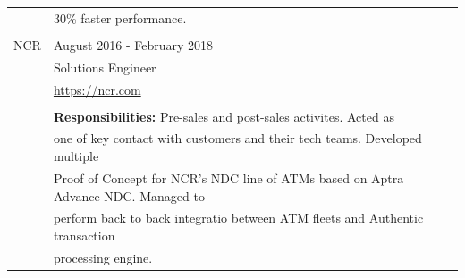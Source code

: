 \documentclass[a4paper]{article}
\begin{document}
\begin{longtable}{@{}r | l}
                   & 30\% faster performance.                                                              \\
                   &                                                                                       \\
    NCR            & August 2016 - February 2018                                                           \\
                   & Solutions Engineer                                                                    \\
                   & \href{https://ncr.com}{https://ncr.com}                                               \\
                   &                                                                                       \\
                   & \textbf{Responsibilities:} Pre-sales and post-sales activites. Acted as               \\
                   & one of key contact with customers and their tech teams. Developed multiple            \\
                   & Proof of Concept for NCR's NDC line of ATMs based on Aptra Advance NDC. Managed to    \\
                   & perform back to back integratio between ATM fleets and Authentic transaction          \\
                   & processing engine.                                                                    \\
\end{longtable}
\end{document}
